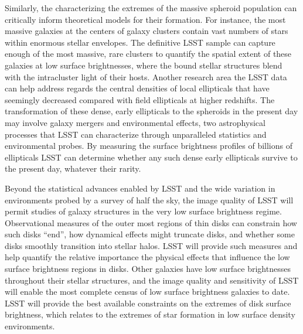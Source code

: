 Similarly, the characterizing the extremes of the
massive spheroid population can critically inform
theoretical models for their formation. For instance,
the most massive galaxies at the centers of galaxy clusters
contain vast numbers of stars within enormous stellar
envelopes. The definitive LSST sample can capture enough
of the most massive, rare clusters to quantify the 
spatial extent of these galaxies at
low surface brightnesses, where the bound stellar
structures blend with the intracluster light of
their hosts. Another research area the LSST data
can help address regards the central densities of local
ellipticals that have seemingly decreased compared with
field ellipticals at higher redshifts. The transformation
of these dense, early ellipticals to the spheroids in the
present day may involve galaxy mergers and environmental
effects, two astrophysical processes that LSST can characterize
through unparalleled statistics and environmental probes.
By measuring the
surface brightness profiles of billions of 
ellipticals LSST can determine whether any such dense
early ellipticals survive to the present day, whatever
their rarity.

Beyond the statistical advances enabled by LSST and the
wide variation in environments probed by a survey
of half the sky, the image quality of LSST will permit
studies of galaxy structures in the very low surface
brightness regime. Observational
measures of the outer most regions of thin disks can constrain
how such disks ``end'', how dynamical effects might truncate 
disks, and whether some disks smoothly transition into stellar
halos. LSST will provide such measures and  help quantify the
relative importance the physical effects that influence the
low surface brightness regions in disks. Other galaxies
have low surface brightnesses throughout their stellar 
structures, and the image quality and sensitivity 
of LSST will enable the most complete census
of low surface brightness galaxies to date. LSST will provide
the best available constraints on the extremes of disk
surface brightness, which relates to the extremes of
star formation in low surface density environments.

